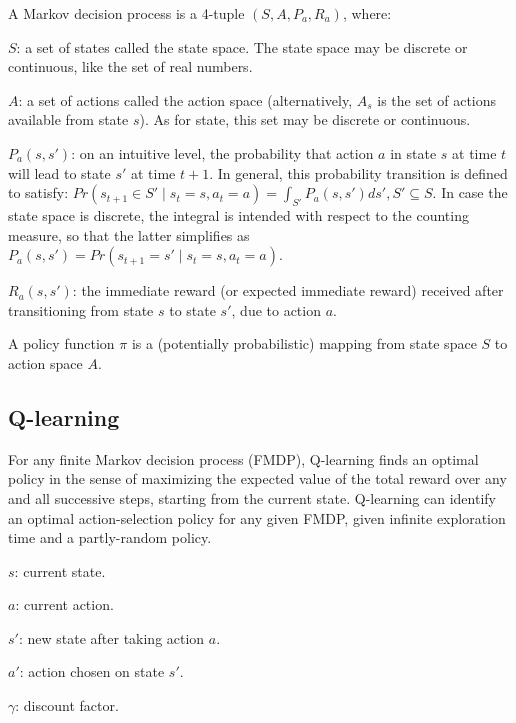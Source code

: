 \documentclass{article}
\begin{document}
\noindent A Markov decision process is a 4-tuple \((S,A,P_{a},R_{a})\), where:

\bigskip

\noindent \(S\): a set of states called the state space. The state space may be discrete or continuous, like the set of real numbers.

\noindent \(A\): a set of actions called the action space (alternatively, \(A_{s}\) is the set of actions available from state \(s\)). As for state, this set may be discrete or continuous.

\noindent \(P_{a}(s,s')\): on an intuitive level, the probability that action \(a\) in state \(s\) at time \(t\) will lead to state \(s'\) at time \(t+1\). In general, this probability transition is defined to satisfy: \(Pr(s_{t+1} \in S' \mid s_{t}=s, a_{t}=a) = \int_{S'} P_{a}(s,s') ds', S' \subseteq S\). In case the state space is discrete, the integral is intended with respect to the counting measure, so that the latter simplifies as \(P_{a}(s,s') = Pr(s_{t+1}=s' \mid s_{t}=s, a_{t}=a)\).

\noindent \(R_{a}(s,s')\): the immediate reward (or expected immediate reward) received after transitioning from state \(s\) to state \(s'\), due to action \(a\).

\bigskip

\noindent A policy function \(\pi\) is a (potentially probabilistic) mapping from state space \(S\) to action space \(A\).

\subsection{Q-learning}

\noindent For any finite Markov decision process (FMDP), Q-learning finds an optimal policy in the sense of maximizing the expected value of the total reward over any and all successive steps, starting from the current state. Q-learning can identify an optimal action-selection policy for any given FMDP, given infinite exploration time and a partly-random policy.

\bigskip

\noindent \(s\): current state.

\noindent \(a\): current action.

\noindent \(s'\): new state after taking action \(a\).

\noindent \(a'\): action chosen on state \(s'\).

\noindent \(\gamma\): discount factor.
\end{document}
